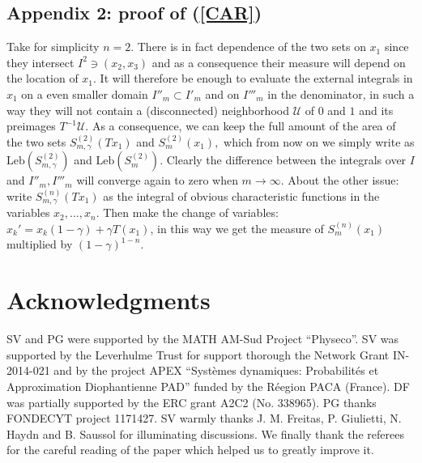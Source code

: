 \documentclass[12pt,reqno,a4paper]{amsart}
\def\Le{\text{Leb}}
\begin{document}
\subsection{Appendix 2: proof of (\ref{CAR})}
 Take for simplicity $n=2.$ There is in fact dependence of the two sets on $x_1$ since they intersect $I^2\ni (x_2, x_3)$ and as a consequence their measure will  depend on the location of $x_1.$ It  will  therefore be enough to evaluate  the external integrals in $x_1$ on a even smaller domain  $I''_m\subset I'_m$ and on $I'''_m$ in the   denominator, in such a way they will not  contain a (disconnected) neighborhood $\mathcal{U}$ of $0$ and $1$ and its preimages $T^{-1}\mathcal{U}.$   As a consequence, we can keep the full amount of the area of the two sets $S^{(2)}_{m,\gamma}(Tx_1)$ and $S^{(2)}_{m}(x_1),$ which from now on we simply write as $\Le (S^{(2)}_{m,\gamma})$ and $\Le(S^{(2)}_{m}).$ Clearly the difference between the integrals over $I$ and $I''_m, I'''_m$ will converge again  to zero when $m\rightarrow \infty.$
 About the other issue: write $S^{(n)}_{m,\gamma}(Tx_1)$ as the integral of obvious characteristic functions in the variables $x_2, \dots, x_n.$ Then make the change of variables:  $x_k'=x_k (1-\gamma)+\gamma T(x_1)$, in this way we get the measure of $S^{(n)}_{m}(x_1)$  multiplied by $(1-\gamma)^{1-n}.$
\section*{Acknowledgments}

SV and PG were supported by  the MATH AM-Sud Project “Physeco”. SV was supported  by  the Leverhulme Trust  for support thorough the Network Grant IN-2014-021  and by the project APEX “Syst\`emes dynamiques: Probabilit\'es et Approximation Diophantienne
PAD” funded by the R\'eegion PACA (France). DF was partially supported by the ERC grant A2C2 (No. 338965). PG thanks FONDECYT project 1171427.  SV warmly thanks J. M. Freitas, P. Giulietti, N. Haydn and B. Saussol  for illuminating discussions.
We finally thank the referees for the careful reading of the paper which helped us to greatly improve it.
\end{document}
